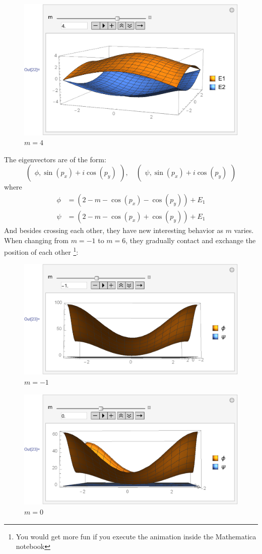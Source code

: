\documentclass{article}
\begin{document}
    \begin{figure}[H]
        \centering
        \includegraphics[width=0.6\linewidth]{pics/OpenBC-inXY/E-m4.pdf}
        \caption{$m=4$}
    \end{figure}

    The eigenvectors are of the form:
    \begin{equation}
        \begin{pmatrix}
            \phi, \sin(p_x)+i\cos(p_y)
        \end{pmatrix},\quad \begin{pmatrix}
            \psi, \sin(p_x)+i\cos(p_y)
        \end{pmatrix}
    \end{equation}
    where
    \begin{align}
        \phi &=  (2-m-\cos(p_x)-\cos(p_y))+E_1 \\
        \psi &=  (2-m-\cos(p_x)+\cos(p_y))+E_1
    \end{align}
    And besides crossing each other, they have new interesting behavior as
    $m$ varies. When changing from $m=-1$ to $m=6$, they gradually contact
    and exchange the position of each other
    \footnote{You would get more fun if you execute the animation inside
    the Mathematica notebook}:
    \begin{figure}[H]
        \centering
        \includegraphics[width=0.6\linewidth]{pics/OpenBC-inXY/Eigen-mN1.pdf}
        \caption{$m=-1$}
    \end{figure}
    \begin{figure}[H]
        \centering
        \includegraphics[width=0.6\linewidth]{pics/OpenBC-inXY/Eigen-m0.pdf}
        \caption{$m=0$}
    \end{figure}
\end{document}
